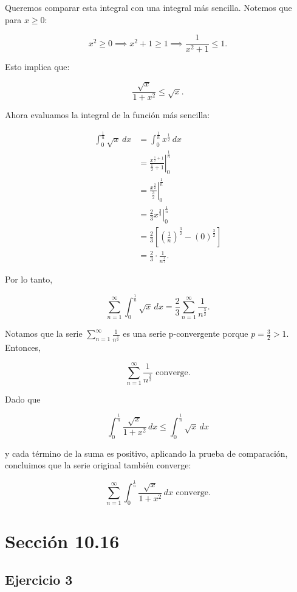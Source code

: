 \documentclass{article}
\begin{document}
    Queremos comparar esta integral con una integral más sencilla. Notemos que para $x \geq 0$:

    $$ x^2 \geq 0 \implies x^2 + 1 \geq 1 \implies \frac{1}{x^2 + 1} \leq 1. $$

    Esto implica que:

    $$ \frac{\sqrt{x}}{1 + x^2} \leq \sqrt{x}. $$

    Ahora evaluamos la integral de la función más sencilla:

    $$
    \begin{align*}
    \int_{0}^{\frac{1}{n}} \sqrt{x} \, dx &= \int_{0}^{\frac{1}{n}} x^{\frac{1}{2}} \, dx \\
    &= \left. \frac{x^{\frac{1}{2} + 1}}{\frac{1}{2} + 1} \right|_{0}^{\frac{1}{n}} \\
    &= \left. \frac{x^{\frac{3}{2}}}{\frac{3}{2}} \right|_{0}^{\frac{1}{n}} \\
    &= \left. \frac{2}{3} x^{\frac{3}{2}} \right|_{0}^{\frac{1}{n}} \\
    &= \frac{2}{3} \left[ \left( \frac{1}{n} \right)^{\frac{3}{2}} - (0)^{\frac{3}{2}} \right] \\
    &= \frac{2}{3} \cdot \frac{1}{n^{\frac{3}{2}}}.
    \end{align*}
    $$

    Por lo tanto,

    $$ \sum_{n=1}^{\infty} \int_{0}^{\frac{1}{n}} \sqrt{x} \, dx = \frac{2}{3} \sum_{n=1}^{\infty} \frac{1}{n^{\frac{3}{2}}}. $$

    Notamos que la serie $\sum_{n=1}^{\infty} \frac{1}{n^{\frac{3}{2}}}$ es una serie p-convergente porque $p=\frac{3}{2}>1$. Entonces,

    $$ \sum_{n=1}^{\infty} \frac{1}{n^{\frac{3}{2}}} \text{ converge}. $$

    Dado que

    $$ \int_{0}^{\frac{1}{n}} \frac{\sqrt{x}}{1 + x^2} \, dx \leq \int_{0}^{\frac{1}{n}} \sqrt{x} \, dx $$

    y cada término de la suma es positivo, aplicando la prueba de comparación, concluimos que la serie original también converge:

    $$ \sum_{n=1}^{\infty} \int_{0}^{\frac{1}{n}} \frac{\sqrt{x}}{1 + x^2} \, dx \text{ converge}. $$
    \section*{Sección 10.16}
    \subsection*{Ejercicio 3}
\end{document}
